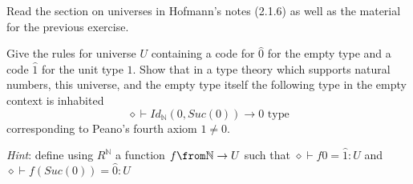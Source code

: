 \begin{exercise}
  Read the section on universes in Hofmann's notes (2.1.6) as well as the
  material for the previous exercise.

  Give the rules for universe $U$ containing a code for $\hat{0}$ for the empty
  type and a code $\hat{1}$ for the unit type $1$. Show that in a type theory
  which supports natural numbers, this universe, and the empty type itself the
  following type in the empty context is inhabited
  \[
    \diamond \vdash Id_\mathbb{N}(0, Suc(0)) \to 0 \text{ type}
  \]
  corresponding to Peano's fourth axiom $1 \neq 0$.

  \emph{Hint}: define using $R^\mathbb{N}$ a function $f \from \mathbb{N} \to
  U$ such that $\diamond \vdash f 0 = \hat{1}: U$ and $\diamond \vdash
  f(Suc(0)) = \hat{0} : U$
\end{exercise}



